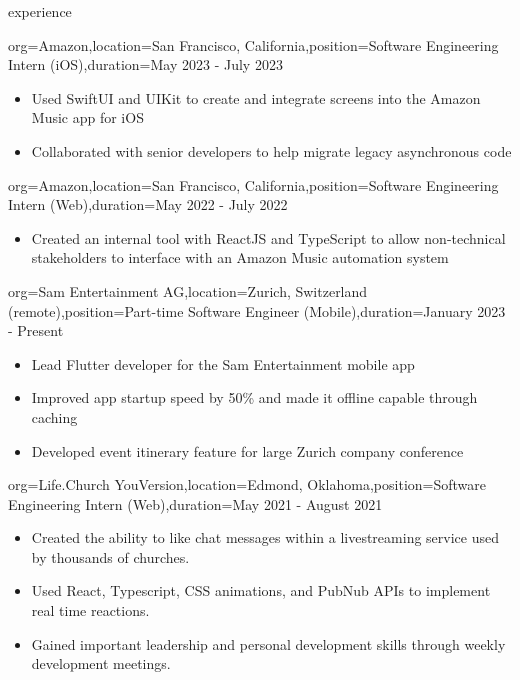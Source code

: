 \documentclass{resume}
\begin{document}
\begin{ResumeSection}{experience}
    \begin{ResumeSubsection}{org={Amazon},location={San Francisco,
        California},position={Software Engineering Intern (iOS)},duration={May 2023 -
    July 2023}}
        \begin{itemize}
            \item Used SwiftUI and UIKit to create and integrate screens into
                the Amazon Music app for iOS
            \item Collaborated with senior developers to help migrate legacy asynchronous code
        \end{itemize}
    \end{ResumeSubsection}
    \begin{ResumeSubsection}{org={Amazon},location={San Francisco,
        California},position={Software Engineering Intern (Web)},duration={May 2022 - July 2022}}
        \begin{itemize}
            \item Created an internal tool with ReactJS and TypeScript to allow
                non-technical stakeholders to interface with an Amazon Music automation
                system
        \end{itemize}
    \end{ResumeSubsection}

    \begin{ResumeSubsection}{org={Sam Entertainment AG},location={Zurich,
        Switzerland (remote)},position={Part-time Software Engineer (Mobile)},duration={January
    2023 - Present}}
        \begin{itemize}
            \item Lead Flutter developer for the Sam Entertainment mobile app
            \item Improved app startup speed by 50\% and made it offline capable
                through caching
            \item Developed event itinerary feature for large Zurich company
                conference
        \end{itemize}
    \end{ResumeSubsection}

    \begin{ResumeSubsection}{org={Life.Church YouVersion},location={Edmond,
        Oklahoma},position={Software Engineering Intern (Web)},duration={May 2021 - August 2021}}
        \begin{itemize}
            \item {Created the ability to like chat messages within a livestreaming service used by
                thousands of churches.}
            \item {Used React, Typescript, CSS animations, and
                PubNub APIs to implement real time reactions.}
            \item Gained important leadership and personal development skills
                through weekly development meetings.
        \end{itemize}
    \end{ResumeSubsection}


\end{ResumeSection}
\end{document}
